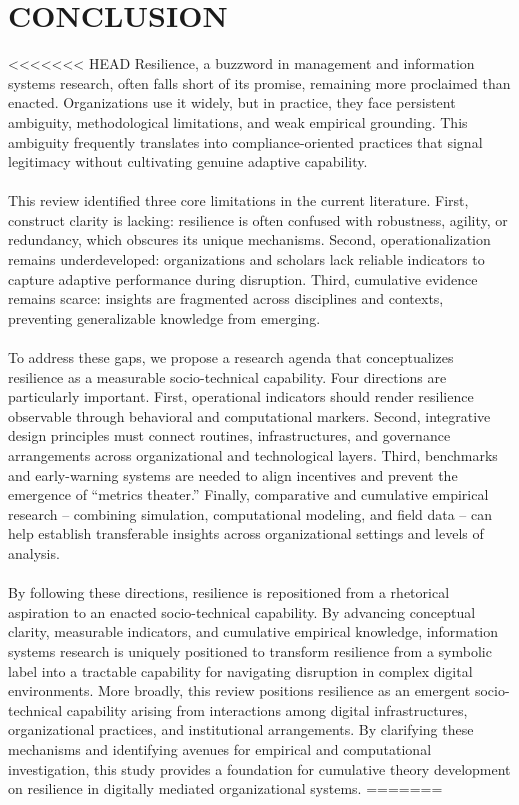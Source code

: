 \section{\MakeUppercase {Conclusion}}
\label{sec:Conclusion}
\renewcommand{\baselinestretch}{2.0}\normalsize

<<<<<<< HEAD
Resilience, a buzzword in management and information systems research, often falls short of its promise, remaining more proclaimed than enacted. Organizations use it widely, but in practice, they face persistent ambiguity, methodological limitations, and weak empirical grounding. This ambiguity frequently translates into compliance-oriented practices that signal legitimacy without cultivating genuine adaptive capability.\\
\\
This review identified three core limitations in the current literature. First, construct clarity is lacking: resilience is often confused with robustness, agility, or redundancy, which obscures its unique mechanisms. Second, operationalization remains underdeveloped: organizations and scholars lack reliable indicators to capture adaptive performance during disruption. Third, cumulative evidence remains scarce: insights are fragmented across disciplines and contexts, preventing generalizable knowledge from emerging.\\
\\
To address these gaps, we propose a research agenda that conceptualizes resilience as a measurable socio-technical capability. Four directions are particularly important. First, operational indicators should render resilience observable through behavioral and computational markers. Second, integrative design principles must connect routines, infrastructures, and governance arrangements across organizational and technological layers. Third, benchmarks and early-warning systems are needed to align incentives and prevent the emergence of “metrics theater.” Finally, comparative and cumulative empirical research -- combining simulation, computational modeling, and field data -- can help establish transferable insights across organizational settings and levels of analysis.\\
\\
By following these directions, resilience is repositioned from a rhetorical aspiration to an enacted socio-technical capability. By advancing conceptual clarity, measurable indicators, and cumulative empirical knowledge, information systems research is uniquely positioned to transform resilience from a symbolic label into a tractable capability for navigating disruption in complex digital environments. More broadly, this review positions resilience as an emergent socio-technical capability arising from interactions among digital infrastructures, organizational practices, and institutional arrangements. By clarifying these mechanisms and identifying avenues for empirical and computational investigation, this study provides a foundation for cumulative theory development on resilience in digitally mediated organizational systems.
=======

